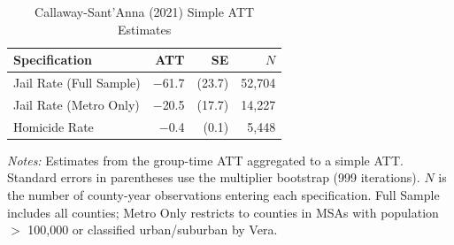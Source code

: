 \begin{table}[ht]
\centering
\begin{tabular}{lrrr}
  \toprule
Specification & ATT & SE & $N$ \\
  \midrule
Jail Rate (Full Sample) & $-$61.7 & (23.7) & 52,704 \\
  Jail Rate (Metro Only) & $-$20.5 & (17.7) & 14,227 \\
  Homicide Rate & $-$0.4 & (0.1) & 5,448 \\
   \bottomrule
\end{tabular}
\caption{Callaway-Sant'Anna (2021) Simple ATT Estimates}
\label{tab:csatt}
\begin{minipage}{\textwidth}
\vspace{0.5em}
\small \textit{Notes:} Estimates from the \citet{callaway2021did} group-time ATT aggregated to a simple ATT. Standard errors in parentheses use the multiplier bootstrap (999 iterations). $N$ is the number of county-year observations entering each specification. Full Sample includes all counties; Metro Only restricts to counties in MSAs with population $>$ 100,000 or classified urban/suburban by Vera.
\end{minipage}
\end{table}
